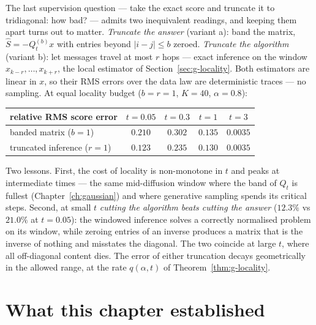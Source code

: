 The last supervision question --- take the exact score and truncate it to
tridiagonal: how bad? --- admits two inequivalent readings, and keeping
them apart turns out to matter. \emph{Truncate the answer} (variant a):
band the matrix, $\widehat S = -Q_t^{(b)} x$ with entries beyond
$|i - j| \leq b$ zeroed. \emph{Truncate the algorithm} (variant b): let
messages travel at most $r$ hops --- exact inference on the window
$x_{k-r}, \dots, x_{k+r}$, the local estimator of
Section~\ref{sec:g-locality}. Both estimators are linear in $x$, so their
RMS errors over the data law are deterministic traces --- no sampling.
At equal locality budget ($b = r = 1$, $K = 40$, $\alpha = 0.8$):
\begin{center}
\begin{tabular}{@{}lcccc@{}}
\toprule
relative RMS score error & $t = 0.05$ & $t = 0.3$ & $t = 1$ & $t = 3$ \\
\midrule
banded matrix ($b = 1$)      & $0.210$ & $0.302$ & $0.135$ & $0.0035$ \\
truncated inference ($r = 1$) & $0.123$ & $0.235$ & $0.130$ & $0.0035$ \\
\bottomrule
\end{tabular}
\end{center}
Two lessons. First, the cost of locality is non-monotone in $t$ and peaks
at intermediate times --- the same mid-diffusion window where the band of
$Q_t$ is fullest (Chapter~\ref{ch:gaussian}) and where generative
sampling spends its critical steps. Second, at small $t$ \emph{cutting the
algorithm beats cutting the answer} ($12.3\%$ vs $21.0\%$ at $t = 0.05$):
the windowed inference solves a correctly normalised problem on its
window, while zeroing entries of an inverse produces a matrix that is the
inverse of nothing and misstates the diagonal. The two coincide at large
$t$, where all off-diagonal content dies. The error of either truncation
decays geometrically in the allowed range, at the rate $q(\alpha, t)$ of
Theorem~\ref{thm:g-locality}.

\section{What this chapter established}\label{sec:bp-summary}

